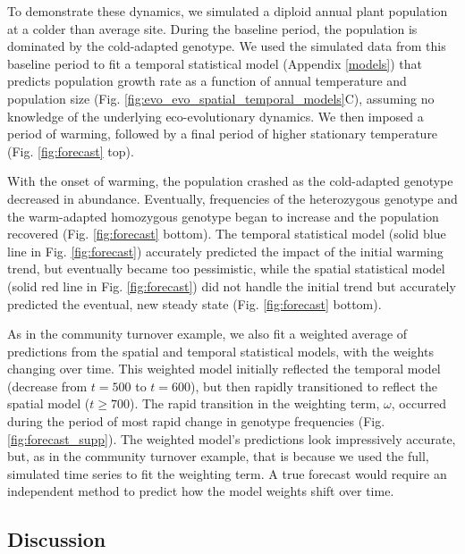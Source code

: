 \documentclass[11pt]{article}
\begin{document}
To demonstrate these dynamics, we simulated a diploid annual plant population at a colder than average site. During the baseline period, the population is dominated by the cold-adapted genotype. We used the simulated data from this baseline period to fit a temporal statistical model (Appendix \ref{models}) that predicts population growth rate as a function of annual temperature and population size (Fig. \ref{fig:evo_evo_spatial_temporal_models}C), assuming no knowledge of the underlying eco-evolutionary dynamics. We then imposed a period of warming, followed by a final period of higher stationary temperature (Fig. \ref{fig:forecast} top).

With the onset of warming, the population crashed as the cold-adapted genotype decreased in abundance. Eventually, frequencies of the heterozygous genotype and the warm-adapted homozygous genotype began to increase and the population recovered (Fig. \ref{fig:forecast} bottom). The temporal statistical model (solid blue line in Fig. \ref{fig:forecast}) accurately predicted the impact of the initial warming trend, but eventually became too pessimistic, while the spatial statistical model (solid red line in Fig. \ref{fig:forecast}) did not handle the initial trend but accurately predicted the eventual, new steady state (Fig. \ref{fig:forecast} bottom).

As in the community turnover example, we also fit a weighted average of predictions from the spatial and temporal statistical models, with the weights changing over time. This weighted model initially reflected the temporal model (decrease from $t=500$ to $t=600$), but then rapidly transitioned to reflect the spatial model ($t \geq 700$). The rapid transition in the weighting term, $\omega$, occurred during the period of most rapid change in genotype frequencies (Fig. \ref{fig:forecast_supp}). The weighted model's predictions look impressively accurate, but, as in the community turnover example, that is because we used the full, simulated time series to fit the weighting term. A true forecast would require an independent method to predict how the model weights shift over time.

\subsection*{Discussion}
\end{document}
